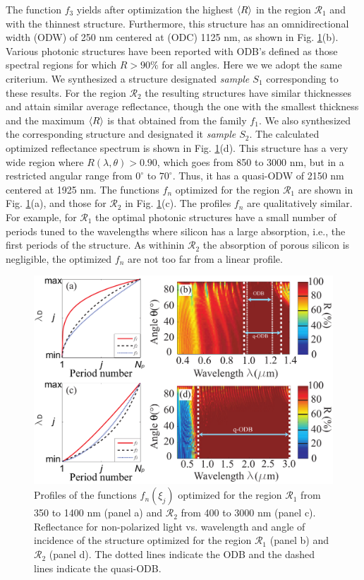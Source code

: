 \documentclass[a4paper,fleqn]{cas-sc}
\begin{document}
	The function $f_{3}$ yields after optimization the highest
	$\braket{R}$ in the region $\mathcal R_1$ and with the thinnest
	structure. Furthermore, this
	structure has an omnidirectional width (ODW) of 250 nm
	centered at (ODC) 1125 nm, as shown in Fig. \ref{Fig1}(b).  Various
	photonic structures have been reported with
	ODB's \cite{Xu2018,Ahmed2014,Reiner2000} defined as those spectral regions for
	which $R>90\%$ for all angles. Here we we adopt the same criterium.
	We synthesized a structure designated {\em sample $S_1$} corresponding
	to these results. For the region $\mathcal R_2$ the
	resulting structures have similar thicknesses and attain similar average reflectance,
	though the one with the smallest thickness and the maximum $\braket{R}$
	is that obtained from the family $f_{1}$. We
	also synthesized the corresponding
	structure and designated it {\em sample $S_2$}. The
	calculated optimized reflectance spectrum is shown in Fig. \ref{Fig1}(d).
	This structure has a very wide region where $R(\lambda, \theta)>
	0.90$, which goes from 850 to 3000 nm, but in a restricted angular range
	from $0^\circ$ to $70^\circ$. Thus, it has a
	quasi-ODW of 2150 nm centered at 1925 nm.
	The functions $f_n$ optimized for the region $\mathcal R_1$ are shown
	in Fig. \ref{Fig1}(a), and those for $\mathcal R_2$
	in Fig. \ref{Fig1}(c). The profiles $f_n$ are qualitatively
	similar. For example, for $\mathcal R_1$ the optimal photonic
	structures have a small number of periods tuned to the wavelengths where
	silicon has a large absorption, i.e.,  the first periods of the
	structure.
	As withinin $\mathcal R_2$ the absorption of porous silicon is negligible, the optimized $f_n$ are not too
	far from a linear profile.
	\begin{figure}
		\label{Fig1}
		\begin{center}
			\includegraphics[width=\textwidth]{F1Alternativa.pdf}
		\end{center}
		\caption{Profiles of the functions $f_n(\xi_j)$ optimized for
			the region $\mathcal R_1$ from 350 to 1400 nm (panel a) and
			$\mathcal R_2$ from 400 to 3000 nm (panel c). Reflectance
			for non-polarized light
			vs. wavelength and angle of incidence of the structure
			optimized for the region $\mathcal R_1$ (panel b) and
			$\mathcal R_2$ (panel d). The dotted lines
			indicate the ODB and the dashed lines
			indicate the quasi-ODB.}
	\end{figure}
	
\end{document}
